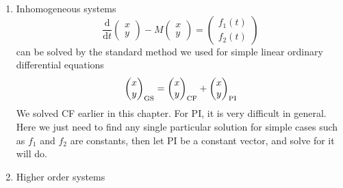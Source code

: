 \documentclass[12pt]{report}
\theoremstyle{definition}
\begin{document}
\begin{enumerate}[label = (\roman*)]
    \item Inhomogeneous systems\[
        \frac{\mathrm{d}}{\mathrm{d}t} \begin{pmatrix}
                x \\
                y
        \end{pmatrix} - M\begin{pmatrix}
                x \\
                y
        \end{pmatrix} = \begin{pmatrix}
        f_1(t) \\
        f_2(t)
        \end{pmatrix}
    \]can be solved by the standard method we used for simple linear ordinary differential equations\[
        \begin{pmatrix}
                x \\
                y
            \end{pmatrix}_{\textnormal{GS}} = \begin{pmatrix}
                    x \\
                    y
                \end{pmatrix}_{\textnormal{CF}} + \begin{pmatrix}
                        x \\
                        y
                    \end{pmatrix}_{\textnormal{PI}}
    \]
    We solved CF earlier in this chapter. For PI, it is very difficult in general.
    Here we just need to find any single particular solution for simple cases such as
    $f_1$ and $f_2$ are constants, then let PI be a constant vector, and solve for it will do.

\item Higher order systems


\end{enumerate}
\end{document}

